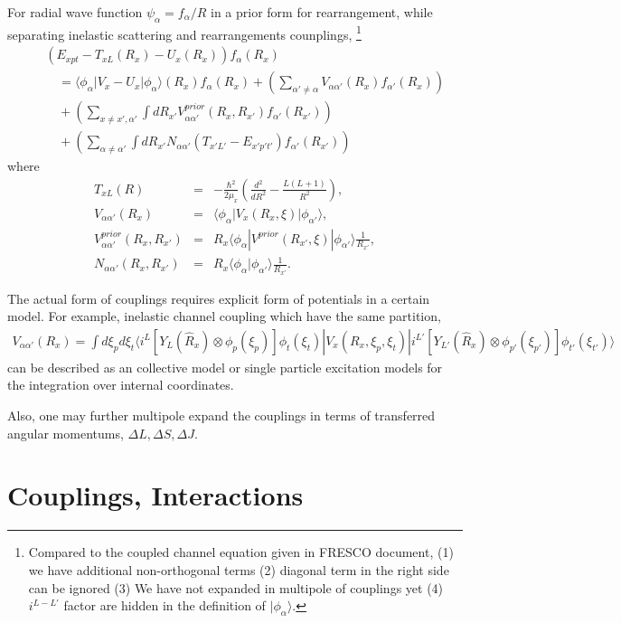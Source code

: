 \documentclass[11pt]{book}
\def\la{\langle}
\def\ra{\rangle}
\newcommand{\bea}{\begin{eqnarray}}
\newcommand{\eea}{\end{eqnarray}}
\newcommand{\no}{\nonumber \\}
\begin{document}
For radial wave function $\psi_\alpha=f_\alpha/R$ in a prior form for rearrangement, 
while separating inelastic scattering and rearrangements counplings,
\footnote{Compared to the coupled channel equation given in FRESCO document,
(1) we have additional non-orthogonal terms (2) diagonal term in the right side can be
ignored (3) We have not expanded in multipole of couplings yet (4) $i^{L-L'}$ factor 
are hidden in the definition of $|\phi_\alpha\ra$. 	

}   
\bea 
& &(E_{xpt}-T_{xL}(R_x)-U_x(R_x))f_\alpha(R_x) \no 
& &\quad =\la \phi_\alpha| V_x-U_x|\phi_\alpha\ra(R_x) f_\alpha(R_x) 
+\left( \sum_{\alpha'\neq \alpha} V_{\alpha \alpha'}(R_x)f_{\alpha'}(R_x)\right) 
\no 
& &\quad  +\left(\sum_{x\neq x',\alpha' }\int dR_{x'}  V^{prior}_{\alpha\alpha'}(R_x,R_{x'})
               f_{\alpha'}(R_{x'})\right) 
\no & &\quad               
          +\left( \sum_{\alpha\neq \alpha'}\int dR_{x'} N_{\alpha\alpha'}(T_{x'L'}-E_{x'p't'})f_{\alpha'}(R_{x'})\right)    
\eea 
where
\bea 
T_{xL}(R)&=&-\frac{\hbar^2}{2\mu_x}\left( \frac{d^2}{dR^2}-\frac{L(L+1)}{R^2}\right),\no 
V_{\alpha\alpha'}(R_x)&=&\la \phi_\alpha|V_x(R_x,\xi)|\phi_{\alpha'}\ra ,\no 
V^{prior}_{\alpha\alpha'}(R_x,R_{x'})&=& R_{x}
                     \la \phi_\alpha|V^{prior}(R_{x'},\xi)|\phi_{\alpha'}\ra\frac{1}{R_{x'}},\no 
N_{\alpha\alpha'}(R_x,R_{x'})&=& R_x\la \phi_\alpha|\phi_{\alpha'}\ra \frac{1}{R_{x'}}.                     
\eea 

The actual form of couplings requires explicit form of potentials in a certain model.
For example, inelastic channel coupling which have the same partition, 
\bea 
V_{\alpha\alpha'}(R_x)=\int d\xi_p d\xi_t \la i^{L} [Y_L(\hat{R}_x)\otimes \phi_p(\xi_p)]\phi_t(\xi_t)|
    V_x(R_x,\xi_p,\xi_t)|i^{L'} 
    [Y_{L'}(\hat{R}_{x})\otimes \phi_{p'}(\xi_{p'})]\phi_{t'}(\xi_{t'})\ra 
\eea 
can be described as an collective model or single particle excitation models
for the integration over internal coordinates. 

Also, one may further multipole expand the couplings in terms of transferred angular momentums,
$\Delta L,\Delta S,\Delta J$. 


\chapter{Couplings, Interactions}
\end{document}
